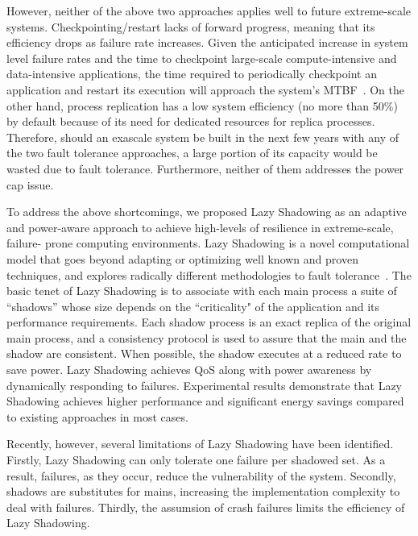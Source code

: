 However, neither of the above two approaches applies well to future extreme-scale systems. Checkpointing/restart lacks of forward progress, meaning that its efficiency drops as failure rate increases. Given the anticipated increase in system level failure rates and the time to checkpoint large-scale 
compute-intensive and data-intensive applications, the time required to periodically checkpoint an application 
and restart its execution will approach the system's MTBF~\cite{Cappello:2009:TER:1640402.1640428}. On the other hand, process replication has a low system efficiency (no more than 50\%) by default because of its need for dedicated resources for replica processes. Therefore, should an exascale system be built in the next few years with any of the two fault tolerance approaches, a large portion of its capacity would be wasted due to fault tolerance. Furthermore, neither of them addresses the power cap issue. 

To address the above shortcomings, we proposed Lazy Shadowing as an adaptive and power-aware approach to achieve high-levels of resilience in extreme-scale, failure- prone computing environments. Lazy Shadowing is a novel computational model that goes beyond adapting or optimizing well known and proven techniques, and explores radically different methodologies to fault tolerance~\cite{cui_2016_scalcom}. 
The basic tenet of Lazy Shadowing is to associate with each main process a suite of “shadows” whose size depends on the 
``criticality" of the application and its performance requirements. Each shadow process is an exact replica of the original 
main process, 
and a consistency protocol is used to assure that the main and the shadow are consistent.  
When possible, the shadow executes at a reduced rate to save power.
Lazy Shadowing achieves QoS along with power awareness by dynamically responding to failures. Experimental results demonstrate that Lazy Shadowing achieves higher performance and significant energy savings compared to existing approaches in most cases. 

Recently, however, several limitations of Lazy Shadowing have been identified. Firstly, Lazy Shadowing can only tolerate one failure per shadowed set. As a result, failures, as they occur, reduce the vulnerability of the system.  Secondly, shadows are substitutes for mains, increasing the implementation complexity to deal with failures. %
Thirdly, the assumsion of crash failures limits the efficiency of Lazy Shadowing. 

